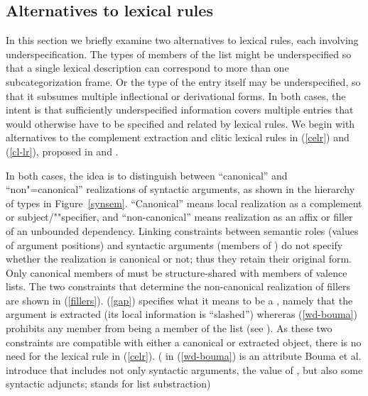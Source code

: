 \documentclass[output=paper
 	        ,biblatex
                ,babelshorthands
                ,newtxmath
                ,draftmode
                ,colorlinks, citecolor=brown
]{langscibook}
\begin{document}
\subsection{Alternatives to lexical rules}
\label{sec:alt}

In this section we briefly examine two alternatives to lexical rules, each involving underspecification. The types of members of the  list might be underspecified so that a single lexical description can correspond to more than one subcategorization frame. Or the type of the entry itself may be underspecified, so that it subsumes multiple inflectional or derivational forms. In both cases, the intent is that sufficiently underspecified information covers multiple entries that would otherwise have to be specified and related by lexical rules. We begin with alternatives to the complement extraction and clitic lexical rules in (\ref{celr}) and (\ref{cl-lr}), proposed in  and .%

In both cases, the idea is to distinguish between ``canonical'' and ``non"=canonical''  realizations of syntactic arguments, as shown in the hierarchy of  types in Figure~\ref{synsem}. ``Canonical'' means local realization as a complement or subject/""specifier, and ``non-canonical'' means realization as an affix or filler of an unbounded dependency. Linking constraints between semantic roles (values of argument positions)   and syntactic arguments (members of ) do not specify whether the realization is canonical or not; thus they retain their original form. Only canonical members of  must be structure-shared with members of valence lists. The two constraints that determine the non-canonical realization of fillers are shown in (\ref{fillers}). (\ref{gap}) specifies what it means to be a , namely that the argument is extracted (its local information is ``slashed'') whereras (\ref{wd-bouma}) prohibits any  member from being a member of the  list (see \citealt[23]{Boumaetal2001}). As these two constraints are compatible with either a canonical or extracted object, there is no need for the lexical rule in (\ref{celr}). ( in (\ref{wd-bouma}) is an attribute Bouma et al. introduce that includes not only syntactic arguments, the value of , but also some syntactic adjuncts; \- stands for list substraction)
\end{document}

